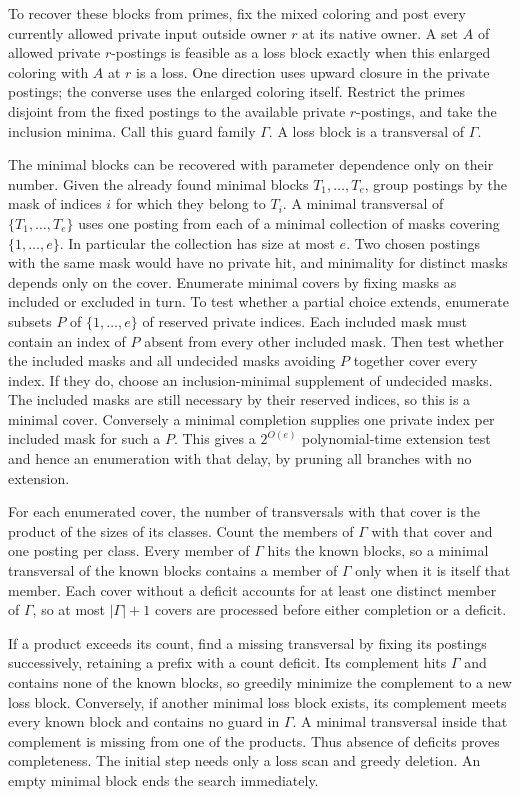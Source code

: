 To recover these blocks from primes, fix the mixed
coloring and post every currently allowed private
input outside owner $r$ at its native owner. A set
$A$ of allowed private $r$-postings is feasible as a
loss block exactly when this enlarged coloring with
$A$ at $r$ is a loss. One direction uses upward
closure in the private postings; the converse uses
the enlarged coloring itself. Restrict the primes disjoint from the fixed postings
to the available private $r$-postings, and take the
inclusion minima. Call this guard family $\Gamma$.
A loss block is a transversal of $\Gamma$.

The minimal blocks can be recovered with parameter
dependence only on their number. Given the already
found minimal blocks $T_1,\ldots,T_e$, group postings
by the mask of indices $i$ for which they belong to
$T_i$. A minimal transversal of $\{T_1,\ldots,T_e\}$
uses one posting from each of a minimal collection
of masks covering $\{1,\ldots,e\}$. In particular the
collection has size at most $e$. Two chosen postings
with the same mask would have no private hit, and
minimality for distinct masks depends only on the
cover. Enumerate minimal covers by fixing masks as
included or excluded in turn. To test whether a
partial choice extends, enumerate subsets $P$ of
$\{1,\ldots,e\}$ of reserved private indices. Each
included mask must contain an index of $P$ absent
from every other included mask. Then test whether
the included masks and all undecided masks avoiding
$P$ together cover every index. If they do, choose
an inclusion-minimal supplement of undecided masks.
The included masks are still necessary by their
reserved indices, so this is a minimal cover.
Conversely a minimal completion supplies one
private index per included mask for such a $P$.
This gives a $2^{O(e)}$ polynomial-time extension
test and hence an enumeration with that delay,
by pruning all branches with no extension.

For each enumerated cover, the number
of transversals with that cover is the product of the
sizes of its classes. Count the members of $\Gamma$
with that cover and one posting per class. Every
member of $\Gamma$ hits the known blocks, so a
minimal transversal of the known blocks contains a
member of $\Gamma$ only when it is itself that member.
Each cover without a deficit accounts for at least
one distinct member of $\Gamma$, so at most
$|\Gamma|+1$ covers are processed before either
completion or a deficit.

If a product exceeds its count, find a missing
transversal by fixing its postings successively,
retaining a prefix with a count deficit. Its
complement hits $\Gamma$ and contains none of the
known blocks, so greedily minimize the complement
to a new loss block. Conversely, if another minimal
loss block exists, its complement meets every known
block and contains no guard in $\Gamma$. A minimal
transversal inside that complement is missing from
one of the products. Thus absence of deficits proves
completeness. The initial step needs only a loss scan
and greedy deletion. An empty minimal block ends the
search immediately.

